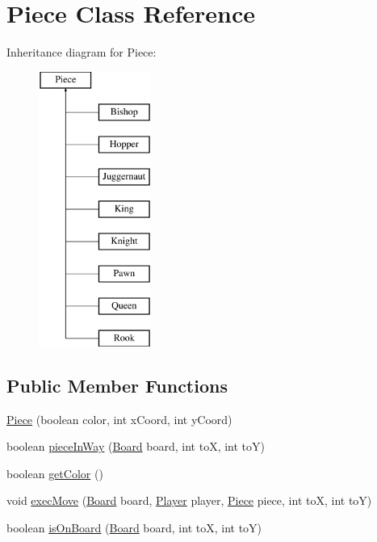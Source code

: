 \hypertarget{class_piece}{}\section{Piece Class Reference}
\label{class_piece}
Inheritance diagram for Piece\+:\begin{figure}[H]
\begin{center}
\leavevmode
\includegraphics[height=9.000000cm]{class_piece}
\end{center}
\end{figure}
\subsection*{Public Member Functions}
\begin{DoxyCompactItemize}
\item 
\hyperlink{class_piece_a3a01b38c9778e479443e782a9ad1b97d}{Piece} (boolean color, int x\+Coord, int y\+Coord)
\item 
boolean \hyperlink{class_piece_a423f42b9f07bd5edf2faba8753083e2f}{piece\+In\+Way} (\hyperlink{class_board}{Board} board, int to\+X, int to\+Y)
\item 
boolean \hyperlink{class_piece_a2b843e1dee9e155eb8e99e3411fd27e6}{get\+Color} ()
\item 
void \hyperlink{class_piece_acf1f3826e59942648be325f3c8f48800}{exec\+Move} (\hyperlink{class_board}{Board} board, \hyperlink{class_player}{Player} player, \hyperlink{class_piece}{Piece} piece, int to\+X, int to\+Y)
\item 
boolean \hyperlink{class_piece_a246d5e14b444acc54178b3c0ca353a06}{is\+On\+Board} (\hyperlink{class_board}{Board} board, int to\+X, int to\+Y)
\end{DoxyCompactItemize}
